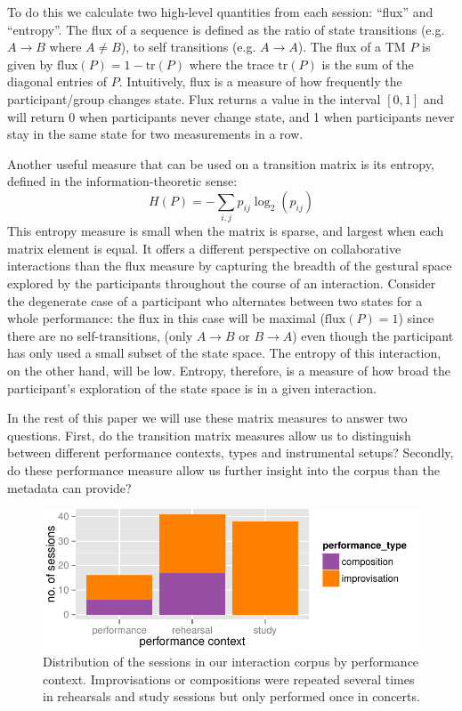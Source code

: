 \documentclass{sigchi}
\begin{document}
To do this we calculate two high-level quantities from each session:
``flux'' and ``entropy''. The flux of a sequence is defined as the
ratio of state transitions (e.g. $A \rightarrow B$ where $A \neq B$),
to self transitions (e.g. $A \rightarrow A $). The flux of a TM $P$ is
given by $\mathrm{flux}(P) = 1 - \mathrm{tr}(P)$ where the trace
$\mathrm{tr}(P)$ is the sum of the diagonal entries of $P$.
Intuitively, flux is a measure of how frequently the participant/group
changes state. Flux returns a value in the interval $[0,1]$ and will
return 0 when participants never change state, and 1 when participants
never stay in the same state for two measurements in a row.

Another useful measure that can be used on a transition matrix is its
entropy, defined in the information-theoretic\cite{Shannon:1948rt}
sense:
\begin{equation}
  H(P) = -\sum_{i,j}p_{ij}\log_2(p_{ij})
\end{equation}
This entropy measure is small when the matrix is sparse, and largest
when each matrix element is equal. It offers a different perspective
on collaborative interactions than the flux measure by capturing the
breadth of the gestural space explored by the participants throughout
the course of an interaction. Consider the degenerate case of a
participant who alternates between two states for a whole performance:
the flux in this case will be maximal ($\mathrm{flux}(P) = 1$) since
there are no self-transitions, (only $A \rightarrow B$ or
$ B \rightarrow A$) even though the participant has only used a small
subset of the state space. The entropy of this interaction, on the
other hand, will be low. Entropy, therefore, is a measure of how broad
the participant's exploration of the state space is in a given
interaction.

In the rest of this paper we will use these matrix measures to answer
two questions. First, do the transition matrix measures allow us to
distinguish between different performance contexts, types and
instrumental setups? Secondly, do these performance measure allow us
further insight into the corpus than the metadata can provide?

\begin{figure}
  \centering
  \includegraphics[width=\linewidth]{figures/sessions-count}
  \caption{Distribution of the sessions in our interaction corpus by
    performance context. Improvisations or compositions were repeated
    several times in rehearsals and study sessions but only performed
    once in concerts.
    \label{fig:count-data}}
\end{figure}
\end{document}
